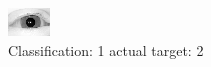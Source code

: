 \begin{figure}[h!]
\begin{center}
\includegraphics[width=0.60\columnwidth]{figures/ID3075_class_1_target_2.png}
\end{center}
\caption{ Classification: 1 actual target: 2}
\label{fig:ID3075_class_1_target_2}
\end{figure}
